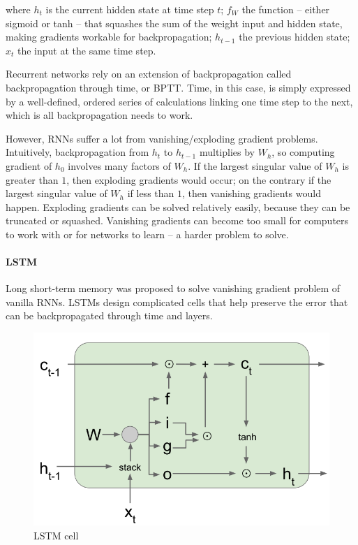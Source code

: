 \documentclass{article} %
\begin{document}
where $h_t$ is the current hidden state at time step $t$; $f_W$ the function -- either sigmoid or tanh -- that squashes the sum of the weight input and hidden state,  making gradients workable for backpropagation; $h_{t-1}$ the previous hidden state; $x_t$ the input at the same time step.

Recurrent networks rely on an extension of backpropagation called backpropagation through time, or BPTT. Time, in this case, is simply expressed by a well-defined, ordered series of calculations linking one time step to the next, which is all backpropagation needs to work.

However, RNNs suffer a lot from vanishing/exploding gradient problems. Intuitively, backpropagation from $h_t$ to $h_{t-1}$ multiplies by $W_h$, so computing gradient of $h_0$ involves many factors of $W_h$. If the largest singular value of $W_h$ is greater than $1$, then exploding gradients would occur; on the contrary if the largest singular value of $W_h$ if less than $1$, then vanishing gradients would happen. Exploding gradients can be solved relatively easily, because they can be truncated or squashed. Vanishing gradients can become too small for computers to work with or for networks to learn – a harder problem to solve. 

\paragraph{LSTM}
Long short-term memory was proposed to solve vanishing gradient problem of vanilla RNNs. LSTMs design complicated cells that help preserve the error that can be backpropagated through time and layers.

\begin{figure}[H]
	\centering
	\includegraphics[width=.6\textwidth]{lstm.png}
	\caption{LSTM cell}
\end{figure}
\end{document}
